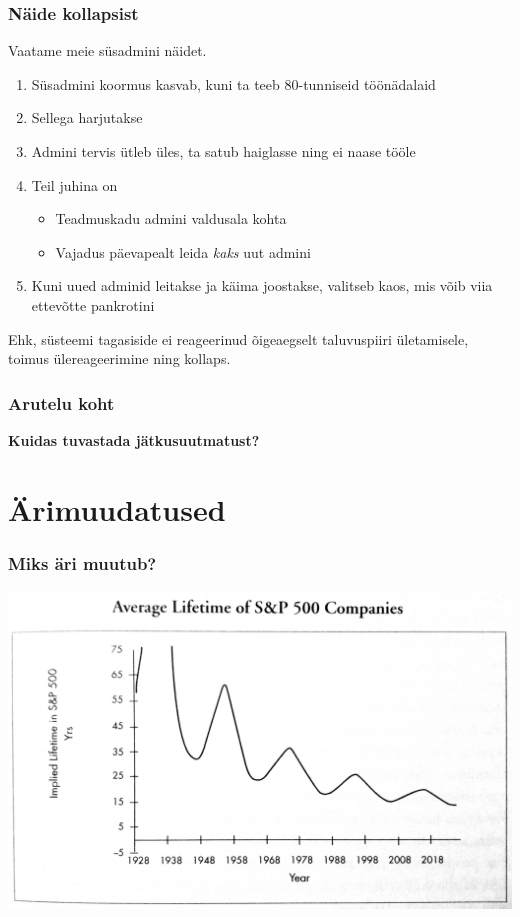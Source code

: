 \begin{frame}[fragile]
  \frametitle{Näide kollapsist}
	Vaatame meie süsadmini näidet. 

	\begin{enumerate}
		\item Süsadmini koormus kasvab, kuni ta teeb 80-tunniseid töönädalaid 
		\item Sellega harjutakse
		\item Admini tervis ütleb üles, ta satub haiglasse ning ei naase tööle
		\item Teil juhina on 
		\begin{itemize}
			\item Teadmuskadu admini valdusala kohta
			\item Vajadus päevapealt leida \emph{kaks} uut admini
		\end{itemize}
		\item Kuni uued adminid leitakse ja käima joostakse, valitseb kaos, mis võib viia ettevõtte pankrotini
	\end{enumerate}
	Ehk, süsteemi tagasiside ei reageerinud õigeaegselt taluvuspiiri ületamisele, toimus ülereageerimine ning kollaps. 
\end{frame}


\begin{frame}[fragile]
  \frametitle{Arutelu koht}
		\begin{center}
			\textbf{Kuidas tuvastada jätkusuutmatust?}
		\end{center}
\end{frame}

\section{Ärimuudatused}
\begin{frame}[fragile]
  \frametitle{Miks äri muutub?}
  	\begin{center}
			\includegraphics[width=.85\textwidth]{sp500.png}
	\end{center}
	\cite{foster2011creative}
\end{frame}

